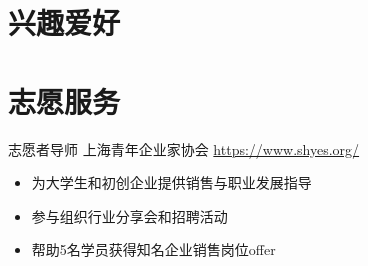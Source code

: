 \documentclass[a4paper, serif, 10pt]{moderncv}
\begin{document}
\section{兴趣爱好}

\section{志愿服务}

        {志愿者导师}
        {上海青年企业家协会}
        {\url{https://www.shyes.org/}}
        {}
        {\begin{itemize}
\item 为大学生和初创企业提供销售与职业发展指导
\item 参与组织行业分享会和招聘活动
\item 帮助5名学员获得知名企业销售岗位offer
\end{itemize}}
    
\end{document}
